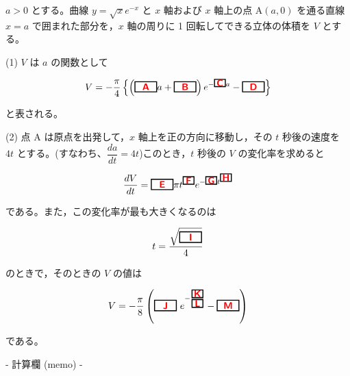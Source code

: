 \documentclass[dvipdfmx,twoside]{jsarticle}
\newcommand{\ab}[1]{%
\begin{tikzpicture}[baseline]
\node[draw=black, 
      rectangle, 
      minimum width=0.8cm, 
      minimum height=0.3cm, 
      font=\bfseries,
      line width=1pt,
      inner sep=2pt,
      anchor=base] {#1};
\end{tikzpicture}%
}
\newcommand{\sab}[1]{%
\begin{tikzpicture}[baseline]
\node[draw=black, 
      rectangle, 
      minimum width=0.4cm, 
      minimum height=0.05cm, 
      font=\bfseries,
      line width=1pt,
      inner sep=0.5pt,
      anchor=base] {#1};
\end{tikzpicture}%
}
\begin{document}
\begin{CJK}{UTF8}{ipxm}
\noindent
$a > 0$ とする。曲線 $y = \sqrt{x}e^{-x}$ と $x$ 軸および $x$ 軸上の点 $\mathrm{A}(a, 0)$ を通る直線 $x = a$ で囲まれた部分を，$x$ 軸の周りに 1 回転してできる立体の体積を $V$ とする。

\vspace{1em}

(1) \quad $V$ は $a$ の関数として

\vspace{0.5em}

\[
V = -\frac{\pi}{4}\left\{\left(\ab{\color{red}{\textsf{A}}}a + \ab{\color{red}{\textsf{B}}}\right)e^{-\sab{\color{red}{\textsf{C}}}a} - \ab{\color{red}{\textsf{D}}}\right\}
\]

\vspace{0.3em}

と表される。

\vspace{1em}

(2) \quad 点 A は原点を出発して，$x$ 軸上を正の方向に移動し，その $t$ 秒後の速度を $4t$ とする。(すなわち、$\dfrac{da}{dt} = 4t$)このとき，$t$ 秒後の $V$ の変化率を求めると

\vspace{0.5em}

\[
\dfrac{dV}{dt} = \ab{\color{red}{\textsf{E}}}\pi t^{\sab{\color{red}{\textsf{F}}}}e^{-\sab{\color{red}{\textsf{G}}}t^{\sab{\color{red}{\textsf{H}}}}}
\]

\vspace{0.3em}

である。また，この変化率が最も大きくなるのは

\vspace{0.5em}

\[
t = \frac{\sqrt{\ab{\color{red}{\textsf{I}}}}}{4}
\]

\vspace{0.3em}

のときで，そのときの $V$ の値は

\vspace{0.5em}

\[
V = -\frac{\pi}{8}\left(\ab{\color{red}{\textsf{J}}}\ e^{-\frac{\sab{\color{red}{\textsf{K}}}}{\sab{\color{red}{\textsf{L}}}}} - \ab{\color{red}{\textsf{M}}}\right)
\]

\vspace{0.3em}

である。


\newpage
\begin{center}
- 計算欄 (memo) -
\end{center}

\end{CJK}
\end{document}
